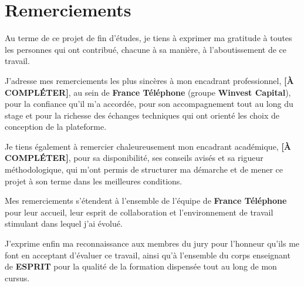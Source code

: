 \chapter*{Remerciements}
\thispagestyle{empty}

Au terme de ce projet de fin d'études, je tiens à exprimer ma gratitude
à toutes les personnes qui ont contribué, chacune à sa manière, à
l'aboutissement de ce travail.

J'adresse mes remerciements les plus sincères à mon encadrant
professionnel, \textbf{[À COMPLÉTER]}, au sein de \textbf{France Téléphone}
(groupe \textbf{Winvest Capital}), pour la confiance qu'il m'a accordée,
pour son accompagnement tout au long du stage et pour la richesse des
échanges techniques qui ont orienté les choix de conception de la
plateforme.

Je tiens également à remercier chaleureusement mon encadrant académique,
\textbf{[À COMPLÉTER]}, pour sa disponibilité, ses conseils avisés et sa
rigueur méthodologique, qui m'ont permis de structurer ma démarche et de
mener ce projet à son terme dans les meilleures conditions.

Mes remerciements s'étendent à l'ensemble de l'équipe de
\textbf{France Téléphone} pour leur accueil, leur esprit de collaboration
et l'environnement de travail stimulant dans lequel j'ai évolué.

J'exprime enfin ma reconnaissance aux membres du jury pour l'honneur qu'ils
me font en acceptant d'évaluer ce travail, ainsi qu'à l'ensemble du corps
enseignant de \textbf{ESPRIT} pour la qualité de la formation dispensée
tout au long de mon cursus.
